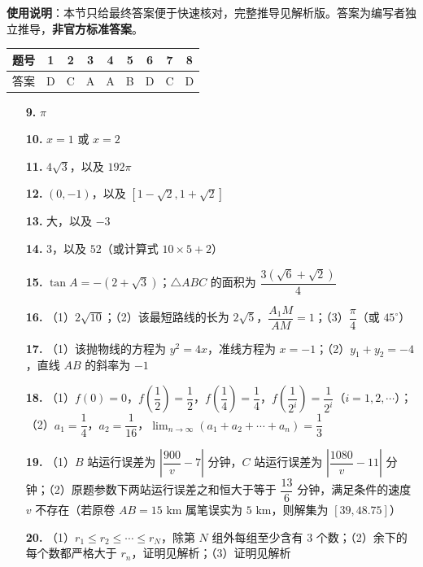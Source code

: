 
\begin{gknotice}
\textbf{使用说明}：本节只给最终答案便于快速核对，完整推导见解析版。答案为编写者独立推导，\textbf{非官方标准答案}。
\end{gknotice}

\begin{center}\begin{tabular}{ccccccccc}
\toprule
题号 & 1 & 2 & 3 & 4 & 5 & 6 & 7 & 8 \\
\midrule
答案 & D & C & A & A & B & D & C & D \\
\bottomrule
\end{tabular}\end{center}

\begin{itemize}[leftmargin=2.6em]
  \item[\textbf{9.}] $\pi$
  \item[\textbf{10.}] $x=1$ 或 $x=2$
  \item[\textbf{11.}] $4\sqrt{3}$，以及 $192\pi$
  \item[\textbf{12.}] $(0,-1)$，以及 $[1-\sqrt{2}, 1+\sqrt{2}]$
  \item[\textbf{13.}] 大，以及 $-3$
  \item[\textbf{14.}] $3$，以及 $52$（或计算式 $10\times 5+2$）
\end{itemize}

\begin{itemize}[leftmargin=2.6em]
  \item[\textbf{15.}] $\tan A=-(2+\sqrt{3})$；$\triangle ABC$ 的面积为 $\dfrac{3(\sqrt{6}+\sqrt{2})}{4}$
  \item[\textbf{16.}] （1）$2\sqrt{10}$；（2）该最短路线的长为 $2\sqrt{5}$，$\dfrac{A_1M}{AM}=1$；（3）$\dfrac{\pi}{4}$（或 $45^\circ$）
  \item[\textbf{17.}] （1）该抛物线的方程为 $y^2=4x$，准线方程为 $x=-1$；（2）$y_1+y_2=-4$，直线 $AB$ 的斜率为 $-1$
  \item[\textbf{18.}] （1）$f(0)=0$，$f\left(\dfrac{1}{2}\right)=\dfrac{1}{2}$，$f\left(\dfrac{1}{4}\right)=\dfrac{1}{4}$，$f\left(\dfrac{1}{2^i}\right)=\dfrac{1}{2^i}$（$i=1, 2, \cdots$）；（2）$a_1=\dfrac{1}{4}$，$a_2=\dfrac{1}{16}$，$\lim_{n\to\infty}(a_1+a_2+\cdots+a_n)=\dfrac{1}{3}$
  \item[\textbf{19.}] （1）$B$ 站运行误差为 $\left|\dfrac{900}{v}-7\right|$ 分钟，$C$ 站运行误差为 $\left|\dfrac{1080}{v}-11\right|$ 分钟；（2）原题参数下两站运行误差之和恒大于等于 $\dfrac{13}{6}$ 分钟，满足条件的速度 $v$ 不存在（若原卷 $AB=15\text{ km}$ 属笔误实为 $5\text{ km}$，则解集为 $[39, 48.75]$）
  \item[\textbf{20.}] （1）$r_1\le r_2\le \cdots \le r_N$，除第 $N$ 组外每组至少含有 $3$ 个数；（2）余下的每个数都严格大于 $r_n$，证明见解析；（3）证明见解析
\end{itemize}
